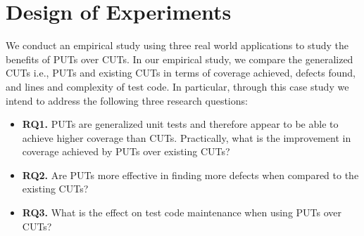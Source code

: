 \section{Design of Experiments}

We conduct an empirical study using three real world applications to study the benefits of PUTs over CUTs. 
In our empirical study, we compare 
the generalized CUTs i.e., PUTs and existing CUTs in terms of coverage achieved, defects found, and lines and complexity of test code. In particular, through this case study we intend to address the following three research questions:
\begin{itemize}
	\item \textbf{RQ1.} PUTs are generalized unit tests and therefore appear to be able to achieve higher coverage than CUTs. Practically, what is the improvement in coverage achieved by PUTs over existing CUTs?
	\item \textbf{RQ2.} Are PUTs more effective in finding more defects when compared to the existing CUTs?
	\item \textbf{RQ3.} What is the effect on test code maintenance when using PUTs over CUTs?
\end{itemize}



